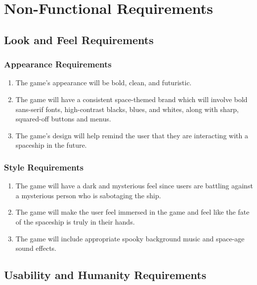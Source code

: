 \documentclass[]{article}
\begin{document}

\section{Non-Functional Requirements}
\label{sec:non-functional_requirements}
\subsection{Look and Feel Requirements}
\label{sub:look_and_feel_requirements}

\subsubsection{Appearance Requirements}
\label{ssub:appearance_requirements}
\begin{enumerate}[{LF}1. ]
	\item The game's appearance will be bold, clean, and futuristic.
	\item The game will have a consistent space-themed brand which will involve bold sans-serif fonts, high-contrast blacks, blues, and whites, along with sharp, squared-off buttons and menus.
	\item The game's design will help remind the user that they are interacting with a spaceship in the future.
\end{enumerate}

\subsubsection{Style Requirements}
\label{ssub:style_requirements}
\begin{enumerate}[{LF}1. ]
	\item The game will have a dark and mysterious feel since users are battling against a mysterious person who is sabotaging the ship.
	\item The game will make the user feel immersed in the game and feel like the fate of the spaceship is truly in their hands.
	\item The game will include appropriate spooky background music and space-age sound effects.
\end{enumerate}

\subsection{Usability and Humanity Requirements}
\label{sub:usability_and_humanity_requirements}
\end{document}

